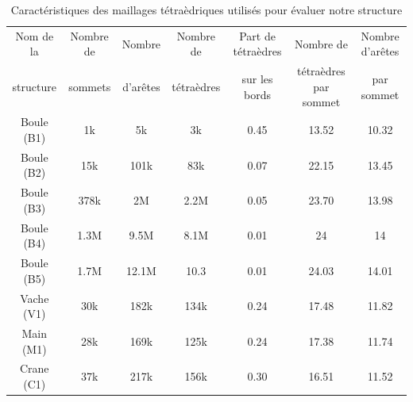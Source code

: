 \begin{table}[H]
\centering
\footnotesize
\begin{tabular}{|c | c | c | c | c| c | c |}
\hline
Nom de la & Nombre de & Nombre& Nombre de & Part de tétraèdres & Nombre de & Nombre d'arêtes\\
structure&sommets&d'arêtes &tétraèdres&sur les bords&tétraèdres par sommet & par sommet\\
\hline
Boule (B1) & 1k & 5k & 3k & 0.45 & 13.52 & 10.32 \\
Boule (B2)& 15k & 101k & 83k & 0.07 & 22.15 & 13.45\\
Boule (B3)& 378k & 2M & 2.2M & 0.05 & 23.70 & 13.98 \\
Boule (B4)& 1.3M & 9.5M & 8.1M & 0.01 & 24 & 14 \\
Boule (B5)& 1.7M & 12.1M & 10.3 & 0.01  & 24.03  & 14.01  \\
Vache (V1)& 30k & 182k & 134k & 0.24 & 17.48 & 11.82 \\
Main (M1)& 28k & 169k & 125k & 0.24 & 17.38 & 11.74\\
Crane (C1)& 37k & 217k & 156k & 0.30 & 16.51 & 11.52 \\ 
\hline  
\end{tabular}
\caption{Caractéristiques des maillages tétraèdriques utilisés pour évaluer notre structure}
\label{tab:caract_maillages}
\end{table}

